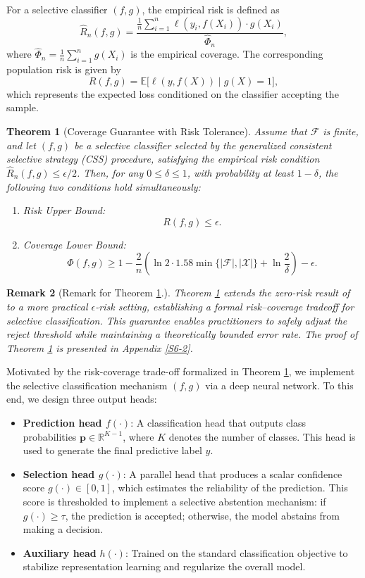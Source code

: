 \documentclass[journal,twoside,web]{ieeecolor}
\newtheorem{theorem}{Theorem}[section]
\newtheorem{remark}[theorem]{Remark}
\begin{document}
For a selective classifier $(f,g)$, the empirical risk is defined as
\[
\hat{R}_n(f,g) = \frac{\frac{1}{n} \sum_{i=1}^n \ell(y_i, f(X_i)) \cdot g(X_i)}
{\hat{\Phi}_n},
\]
where $\hat{\Phi}_n = \frac{1}{n} \sum_{i=1}^n g(X_i)$ is the empirical coverage.
The corresponding population risk is given by
\[
R(f,g) = \mathbb{E}\bigl[\ell(y, f(X)) \mid g(X) = 1\bigr],
\]
which represents the expected loss conditioned on the classifier accepting the sample.
\begin{theorem}[Coverage Guarantee with Risk Tolerance]\label{Th2}
Assume that $\mathcal{F}$ is finite, and let $(f,g)$ be a selective classifier selected by the generalized consistent selective strategy (CSS) procedure, satisfying the empirical risk condition $\hat{R}_n(f,g) \leq \epsilon/2$. Then, for any $0 \leq \delta \leq 1$, with probability at least $1-\delta$, the following two conditions hold simultaneously:
\begin{enumerate}
    \item Risk Upper Bound: 
    \[R(f,g) \leq \epsilon.
    \]
    \item Coverage Lower Bound:
    \[
    \Phi(f,g) \geq 1 - \frac{2}{n} \left( \ln 2 \cdot 1.58\min\{|\mathcal{F}|, |\mathcal{X}|\} + \ln \frac{2}{\delta} \right) - \epsilon.
    \]
\end{enumerate}
\end{theorem}
\begin{remark}[Remark for Theorem \ref{Th2}.]
Theorem \ref{Th2} extends the zero-risk result of \cite{el2010foundations} to a more practical $\epsilon$-risk setting, establishing a formal risk–coverage tradeoff for selective classification. This guarantee enables practitioners to safely adjust the reject threshold while maintaining a theoretically bounded error rate. The proof of Theorem \ref{Th2} is presented in Appendix \ref{S6-2}.
\end{remark}

Motivated by the risk-coverage trade-off formalized in Theorem \ref{Th2}, we implement the selective classification mechanism $(f,g)$ via a deep neural network. To this end, we design three output heads:

\begin{itemize}
\item \textbf{Prediction head $f(\cdot)$}: A classification head that outputs class probabilities $\mathbf{p} \in \mathbb{R}^{K-1}$, where $K$ denotes the number of classes. This head is used to generate the final predictive label $\hat{y}$.
\item \textbf{Selection head $g(\cdot)$}: A parallel head that produces a scalar confidence score $g(\cdot) \in [0,1]$, which estimates the reliability of the prediction. This score is thresholded to implement a selective abstention mechanism: if $g(\cdot) \ge \tau$, the prediction is accepted; otherwise, the model abstains from making a decision.
\item \textbf{Auxiliary head} $h(\cdot)$: Trained on the standard classification objective to stabilize representation learning and regularize the overall model.
\end{itemize}
\end{document}
